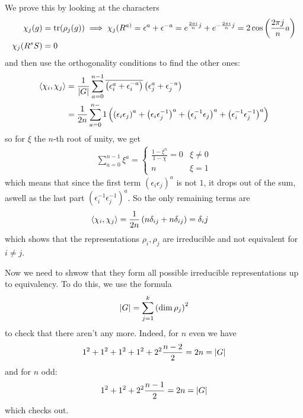 We prove this by looking at the characters
\begin{align*}
  \chi_j(g) &= \operatorname{tr}(\rho_j(g)) \implies \chi_j(R^{a)} = \epsilon^{a} + \epsilon^{-a} = e^{\frac{2 \pi i}{n}j} + e^{-\frac{2 \pi i}{n}j}= 2 \cos \left(
    \frac{2 \pi j}{n}a
  \right)\\
    \chi_j(R^{s}S) &= 0
\end{align*}
and then use the orthogonality conditions to find the other ones:
\begin{align*}
  \langle\chi_i,\chi_j\rangle 
  &= \frac{1}{\vert G\vert} \sum_{a=0}^{n-1}\overline{
    \left(
      \epsilon_i^{a}+\epsilon_i^{-a}
  \right)}
    \left(
    \epsilon_j^{a} + \epsilon_j^{-a}
  \right)
  \\
  &= \frac{1}{2n} \sum_{a=0}^{n-}1
  \left(
    \left(
      \epsilon_i \epsilon_j
    \right)^{a}
    + \left(
      \epsilon_i \epsilon_j^{-1}
    \right)^{a}
    + \left(
      \epsilon_i^{-1} \epsilon_j
    \right)^{a}
    + \left(
      \epsilon_i^{-1}\epsilon_j^{-1}
    \right)^{a}
 \right)
\end{align*}
so for $\xi$ the $n$-th root of unity, we get
\begin{align*}
  \sum_{a=0}^{n-1} \xi^{a} = \left\{\begin{array}{ll}
    \frac{1 - \xi^{n}}{1 - \chi} = 0 & \xi \neq 0\\
     n &  \xi = 1
  \end{array} \right.
\end{align*}
which means that since the first term $\left(\epsilon_i \epsilon_j\right)^{a}$ is not $1$, it drops out of the sum, aswell as the last part 
$\left(\epsilon_i^{-1}\epsilon_j^{-1}\right)^{a}$.
So the only remaining terms are
\begin{align*}
  \langle\chi_i,\chi_j\rangle 
  &=
  \frac{1}{2n} \left(
    n \delta_{ij} + n \delta_{ij}
  \right) = \delta_ij
\end{align*}
which shows that the representations $\rho_i,\rho_j$ are irreducible and not equivalent for $i \neq j$.

Now we need to shwow that they form all possible irreducible representations up to equivalency.
To do this, we use the formula 
\begin{align*}
  \vert G\vert = \sum_{j=1}^{k} \left(
    \dim \rho_j
  \right)^{2}
\end{align*}
to check that there aren't any more. 
Indeed, for $n$ even we have
\begin{align*}
  1^{2} + 1^{2} + 1^{2} + 1^{2} + 2^{2} \frac{n-2}{2} = 2n = \vert G\vert
\end{align*}
and for $n$ odd:
\begin{align*}
  1^{2} + 1^{2} + 2^{2} \frac{n-1}{2} = 2n = \vert G\vert
\end{align*}
which checks out.
  

